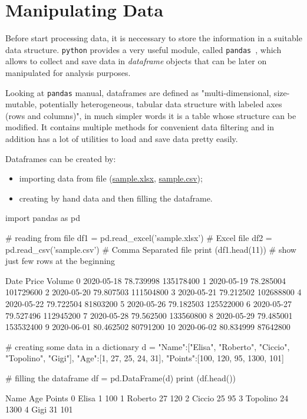 \section{Manipulating Data}
Before start processing data, it is neccessary to store the information in a suitable data structure. \texttt{python} provides a very useful module, called \texttt{pandas}~\cite{pandas}, which allows to collect and save data in \emph{dataframe} objects that can be later on manipulated for analysis purposes.

Looking at \texttt{pandas} manual, dataframes are defined as "multi-dimensional, size-mutable, potentially heterogeneous, tabular data structure with labeled axes (rows and columns)", in much simpler words it is a table whose structure can be modified.
It contains multiple methods for convenient data filtering and in addition has a lot of utilities to load and save data pretty easily.

Dataframes can be created by:
\begin{itemize}
\tightlist
\item importing data from file (\href{https://github.com/matteosan1/finance_course/raw/master/input_files/sample.xlsx}{sample.xlsx}, \href{https://raw.githubusercontent.com/matteosan1/finance_course/master/input_files/sample.csv}{sample.csv});
\item creating by hand data and then filling the dataframe.
\end{itemize}

\begin{ipython}
import pandas as pd

# reading from file
df1 = pd.read_excel('sample.xlsx') # Excel file
df2 = pd.read_csv('sample.csv') # Comma Separated file
print (df1.head(11)) # show just few rows at the beginning
\end{ipython}
\begin{ioutput}
         Date      Price     Volume
0  2020-05-18  78.739998  135178400
1  2020-05-19  78.285004  101729600
2  2020-05-20  79.807503  111504800
3  2020-05-21  79.212502  102688800
4  2020-05-22  79.722504   81803200
5  2020-05-26  79.182503  125522000
6  2020-05-27  79.527496  112945200
7  2020-05-28  79.562500  133560800
8  2020-05-29  79.485001  153532400
9  2020-06-01  80.462502   80791200
10 2020-06-02  80.834999   87642800
\end{ioutput}

\begin{ipython}
# creating some data in a dictionary
d = {"Name":["Elisa", "Roberto", "Ciccio", "Topolino", "Gigi"],
	 "Age":[1, 27, 25, 24, 31],
	 "Points":[100, 120, 95, 1300, 101]}

# filling the dataframe
df = pd.DataFrame(d)
print (df.head())
\end{ipython}
\begin{ioutput}
       Name  Age     Points
0     Elisa    1        100
1   Roberto   27        120
2    Ciccio   25         95
3  Topolino   24       1300
4      Gigi   31        101
\end{ioutput}

